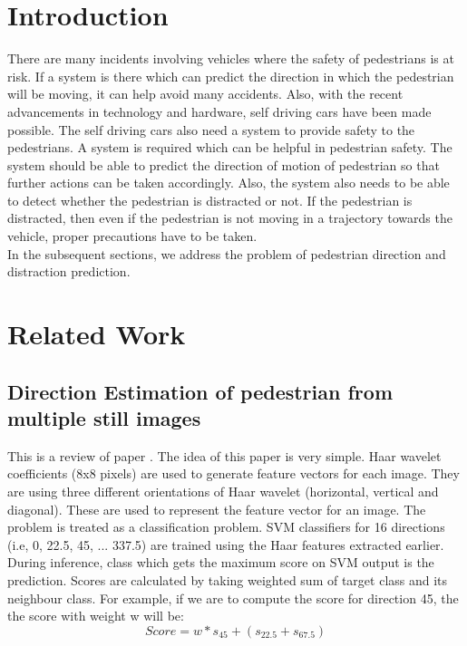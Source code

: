 \documentclass[extendedabs]{bmvc2k}
\begin{document}
\section{Introduction}
There are many incidents involving vehicles where the safety of pedestrians is at risk. If a system is there which can predict the direction in which the pedestrian will be moving, it can help avoid many accidents. Also, with the recent advancements in technology and hardware, self driving cars have been made possible. The self driving cars also need a system to provide safety to the pedestrians. A system is required which can be helpful in pedestrian safety. The system should be able to predict the direction of motion of pedestrian so that further actions can be taken accordingly. Also, the system also needs to be able to detect whether the pedestrian is distracted or not. If the pedestrian is distracted, then even if the pedestrian is not moving in a trajectory towards the vehicle, proper precautions have to be taken. \\
In the subsequent sections, we address the problem of pedestrian direction and distraction prediction. 

\section{Related Work}
\subsection{Direction Estimation of pedestrian from multiple still images}
This is a review of paper \cite{1336451}.
The idea of this paper is very simple. Haar wavelet coefficients (8x8 pixels) are used to generate
feature vectors for each image. They are using three different orientations of Haar wavelet (horizontal, vertical and diagonal). These are used to represent the feature vector for an image.
\newline 
The problem is treated as a classification problem. SVM classifiers for 16 directions (i.e, 0, 22.5, 45, ... 337.5) are trained using the Haar features extracted earlier. During inference, class which gets the maximum score on SVM output is the prediction.
\newline
Scores are calculated by taking weighted sum of target class and its neighbour class. For example, if we
are to compute the score for direction 45, the the score with weight w will be:
\begin{equation}
Score = w*s_{45} + ( s_{22.5} + s_{67.5} )
\end{equation}
\end{document}
